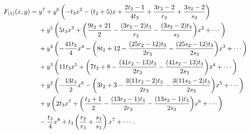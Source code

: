 \begin{align}
    \label{curve:potts_general}
    F_{(1)}(x,y)={} & y^7
    +y^6\left(-t_3x^2-(t_2+5)x+\frac{2t_2-1}{4t_3}
    +\frac{3r_2-2}{r_3}+\frac{3s_2-2}{s_3}\right)\notag \\*
                    & {}+y^5\left(5t_3x^3+\biggl(\frac{9t_2+21}{2}-\frac{(3r_2-2)t_3}{r_3}
    -\frac{(3s_2-2)t_3}{s_3}\biggr)x^2+\cdots\right)\notag \\*
                    & {}+y^4\left(-\frac{41t_3}{4}x^4-\biggl(8t_2+12-\frac{(25r_2-12)t_3}{2r_3}
    -\frac{(25s_2-12)t_3}{2s_3}\biggr)x^3+\cdots\right)\notag \\*
                    & {}+y^3\left(11t_3x^5+\biggl(7t_2+8-\frac{(41r_2-13)t_3}{2r_3}
    -\frac{(41s_2-13)t_3}{2s_3}\biggr)x^4+\cdots\right)\notag \\*
                    & {}+y^2\left(-\frac{13t_3}{2}x^6-\biggl(3t_2+3-\frac{3(11r_2-2)t_3}{2r_3}
    -\frac{3(11s_2-2)t_3}{2s_3}\biggr)x^5+\cdots\right)\notag \\*
                    & {}+y\left(2t_3x^7+\biggl(\frac{t_2+1}{2}-\frac{(13r_2-1)t_3}{2r_3}
    -\frac{(13s_2-1)t_3}{2s_3}\biggr)x^6+\cdots\right)\notag \\*
                    & {}-\frac{t_3}{4}x^8
    +t_3\left(\frac{r_2}{r_3}+\frac{s_2}{s_3}\right)x^7+\cdots.
\end{align}

